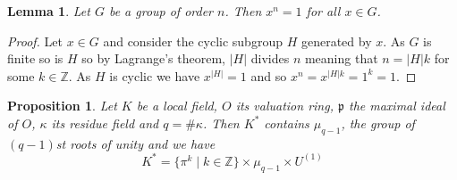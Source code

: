 \documentclass{article}
\newtheorem{proposition}{Proposition}[section]
\newtheorem{lemma}{Lemma}[section]
\newcommand{\mfrak}[1]{\mathfrak{#1}}
\newcommand{\mbb}[1]{\mathbb{#1}}
\begin{document}
\begin{lemma}\label{lem: x^|G| = 1}
    Let $G$ be a group of order $n$. Then $x^n = 1$ for all $x \in G$.
\end{lemma}
\begin{proof}
    Let $x \in G$ and consider the cyclic subgroup $H$ generated by $x$. As $G$ is finite so is $H$ so by Lagrange's theorem, $|H|$ divides $n$ meaning that $n = |H|k$ for some $k \in \mbb Z$. As $H$ is cyclic we have $x^{|H|} = 1$ and so $x^n = x^{|H|k} = 1^k = 1$.
\end{proof}


\begin{proposition}\label{prop: Factorization of elements in K^*}
    Let $K$ be a local field, $O$ its valuation ring, $\mfrak p$ the maximal ideal of $O$, $\kappa$ its residue field and $q = \#\kappa$. Then $K^*$ contains $\mu_{q-1}$, the group of $(q-1)$st roots of unity and we have
    $$K^* = \{\pi^k \mid k \in \mbb Z \} \times \mu_{q-1} \times U^{(1)}$$ 
\end{proposition}
\end{document}
